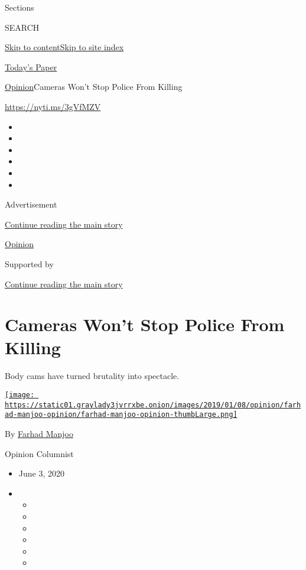Sections

SEARCH

\protect\hyperlink{site-content}{Skip to
content}\protect\hyperlink{site-index}{Skip to site index}

\href{https://myaccount.nytimes3xbfgragh.onion/auth/login?response_type=cookie\&client_id=vi}{}

\href{https://www.nytimes3xbfgragh.onion/section/todayspaper}{Today's
Paper}

\href{/section/opinion}{Opinion}\textbar{}Cameras Won't Stop Police From
Killing

\url{https://nyti.ms/3gVfMZV}

\begin{itemize}
\item
\item
\item
\item
\item
\item
\end{itemize}

Advertisement

\protect\hyperlink{after-top}{Continue reading the main story}

\href{/section/opinion}{Opinion}

Supported by

\protect\hyperlink{after-sponsor}{Continue reading the main story}

\hypertarget{cameras-wont-stop-police-from-killing}{%
\section{Cameras Won't Stop Police From
Killing}\label{cameras-wont-stop-police-from-killing}}

Body cams have turned brutality into spectacle.

\href{https://www.nytimes3xbfgragh.onion/by/farhad-manjoo}{\texttt{[image: https://static01.graylady3jvrrxbe.onion/images/2019/01/08/opinion/farhad-manjoo-opinion/farhad-manjoo-opinion-thumbLarge.png]}}

By \href{https://www.nytimes3xbfgragh.onion/by/farhad-manjoo}{Farhad
Manjoo}

Opinion Columnist

\begin{itemize}
\item
  June 3, 2020
\item
  \begin{itemize}
  \item
  \item
  \item
  \item
  \item
  \item
  \end{itemize}
\end{itemize}

